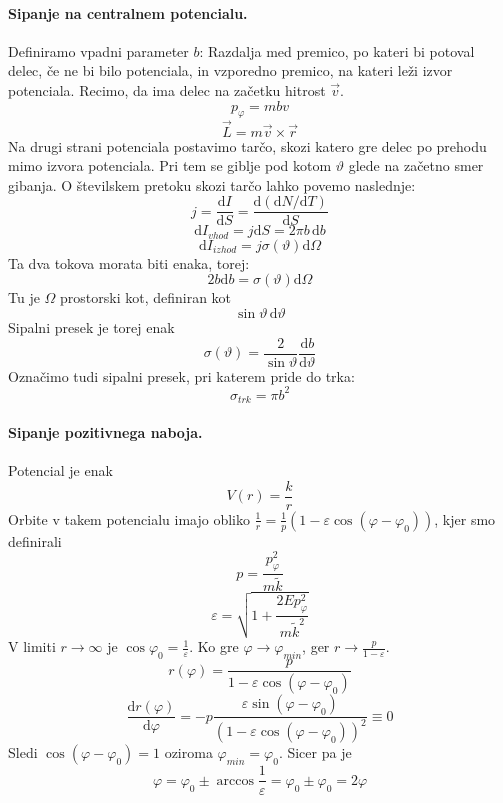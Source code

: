 \documentclass[a4paper]{article}
\newcommand{\vct}[1]{\overrightarrow{#1}}
\newcommand{\dif}{\mathrm{d}}
\newcommand{\dd}[2]{\frac{\mathrm{d} {#1}}{\mathrm{d} {#2}}}
\begin{document}
\paragraph{Sipanje na centralnem potencialu.} Definiramo vpadni parameter $b$: Razdalja med premico, po kateri bi potoval delec, če ne bi bilo potenciala, in vzporedno premico, na kateri leži izvor potenciala.
Recimo, da ima delec na začetku hitrost $\vct{v}$.
$$p_\varphi = mbv$$
$$\vct{L} = m\vct{v}\times\vct{r}$$
Na drugi strani potenciala postavimo tarčo, skozi katero gre delec po prehodu mimo izvora potenciala. Pri tem se giblje pod kotom $\vartheta$ glede na začetno smer gibanja.
O številskem pretoku skozi tarčo lahko povemo naslednje:
$$j = \dd{I}{S} = \dd{(\dif N/\dif T)}{S}$$
$$\dif I_{vhod} = j \dif S = 2\pi b\,\dif b$$
$$\dif I_{izhod} = j \sigma(\vartheta) \dif\Omega$$
Ta dva tokova morata biti enaka, torej:
$$2 b \dif b = \sigma(\vartheta)\dif\Omega$$
Tu je $\Omega$ prostorski kot, definiran kot $$\sin\vartheta\,\dif\vartheta$$
Sipalni presek je torej enak $$\sigma(\vartheta) = \frac{2}{\sin\vartheta}\dd{b}{\vartheta}$$
Označimo tudi sipalni presek, pri katerem pride do trka:
$$\sigma_{trk} = \pi b^2$$
\paragraph{Sipanje pozitivnega naboja.} Potencial je enak
$$V(r) = \frac{k}{r}$$
Orbite v takem potencialu imajo obliko $\displaystyle{\frac{1}{r} = \frac{1}{p}\left(1 - \varepsilon\cos(\varphi - \varphi_0)\right)}$,
kjer smo definirali $$p = \frac{p_\varphi^2}{m\tilde{k}}$$
$$\varepsilon = \sqrt{1 + \frac{2Ep_\varphi^2}{m\tilde{k}^2}}$$
V limiti $r \to \infty$ je $\cos\varphi_0 = \frac{1}{\varepsilon}$. Ko gre $\varphi \to \varphi_{min}$, ger $\displaystyle{r \to \frac{p}{1 - \varepsilon}}$.
$$r(\varphi) = \frac{p}{1 - \varepsilon\cos(\varphi - \varphi_0)}$$
$$\dd{r(\varphi)}{\varphi} = -p\frac{\varepsilon\sin(\varphi - \varphi_0)}{(1 - \varepsilon\cos(\varphi - \varphi_0))^2} \equiv 0$$
Sledi $\cos(\varphi - \varphi_0) = 1$ oziroma $\varphi_{min} = \varphi_0$. Sicer pa je
$$\varphi = \varphi_0 \pm \arccos\frac{1}{\varepsilon} = \varphi_0\pm\varphi_0 = 2\varphi$$
\end{document}
